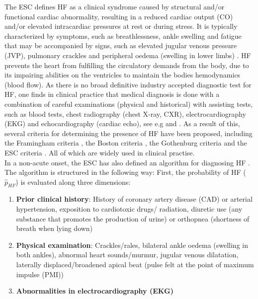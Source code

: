 \documentclass[../thesis.tex]{subfiles}
\begin{document}
\noindent The ESC defines HF as a clinical syndrome caused by structural and/or functional cardiac abnormality, resulting in a reduced cardiac output (CO) and/or elevated intracardiac pressures at rest or during stress. It is typically characterized by symptoms, such as breathlessness, ankle swelling and fatigue that may be accompanied by signs, such as elevated jugular venous pressure (JVP), pulmonary crackles and peripheral oedema (swelling in lower limbs) \citep{ponikowski2016}. HF prevents the heart from fulfilling the circulatory demands from the body, due to its impairing abilities on the ventricles to maintain the bodies hemodynamics (blood flow). As there is no broad definitive industry accepted diagnostic test for HF, one finds in clinical practice that medical diagnosis is done with a combination of careful examinations (physical and historical) with assisting tests, such as blood tests, chest radiography (chest X-ray, CXR), electrocardiography (EKG) and echocardiography (cardiac echo), see e.g \cite{henein2010heart} and \cite{son2012decision}. As a result of this, several criteria for determining the presence of HF have been proposed, including the Framingham criteria \citep{mckee1971natural}, the Boston criteria \citep{carlson1985analysis}, the Gothenburg criteria \citep{eriksson1987cardiac} and the ESC criteria \citep{swedberg2005guidelines} \citep{roger2010heart}. All of which are widely used in clinical practise.\\
\indent In a non-acute onset, the ESC has also defined an algorithm for diagnosing HF \citep{ponikowski2016}. The algorithm is structured in the following way: First, the probability of HF ($\hat{p}_{HF}$) is evaluated along three dimensions: 
\begin{enumerate}[label=(\roman*)]
    \item \textbf{Prior clinical history}: History of coronary artery disease (CAD) or arterial hypertension, exposition to cardiotoxic drugs/ radiation, diuretic use (any substance that promotes the production of urine) or orthopnea (shortness of breath when lying down)
    \item \textbf{Physical examination}: Crackles/rales, bilateral ankle oedema (swelling in both ankles), abnormal heart sounds/murmur, jugular venous dilatation, laterally displaced/broadened apical beat (pulse felt at the point of maximum impulse (PMI))
    \item \textbf{Abnormalities in electrocardiography (EKG)}
\end{enumerate}
\end{document}

